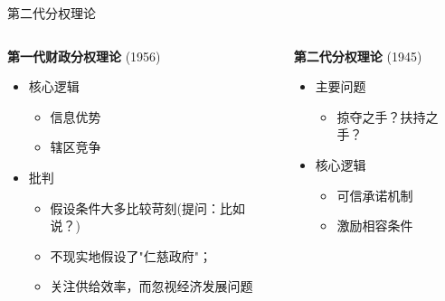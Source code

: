 \documentclass{beamer}
\begin{document}
\begin{frame}{第二代分权理论}
\label{ux7b2cux4e8cux4ee3ux5206ux6743ux7406ux8bba}
\begin{columns}[T]
\begin{column}{0.48\textwidth}
  \textbf{第一代财政分权理论} (1956)
  \begin{itemize}\footnotesize
    \item 核心逻辑
        \begin{itemize}
            \item 信息优势
            \item 辖区竞争
        \end{itemize}
    \item 批判
        \begin{itemize}
            \item 假设条件大多比较苛刻(提问：比如说？)
            \item 不现实地假设了"仁慈政府"；
            \item 关注供给效率，而忽视经济发展问题
        \end{itemize}
  \end{itemize}
\end{column}
\begin{column}{0.48\textwidth}
  \textbf{第二代分权理论} (1945)
  \begin{itemize}\footnotesize
    \item 主要问题
        \begin{itemize}
            \item 掠夺之手？扶持之手？
        \end{itemize}
    \item 核心逻辑
        \begin{itemize}
            \item 可信承诺机制
            \item 激励相容条件
        \end{itemize}
  \end{itemize}
\end{column}
\end{columns}
\end{frame}
\end{document}
